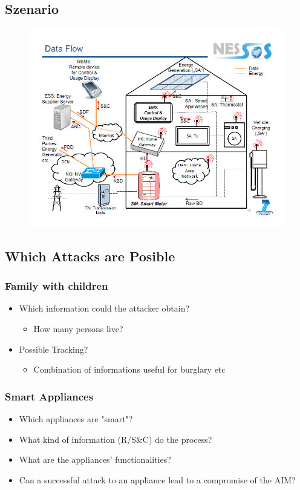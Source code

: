\documentclass[a4paper, 12pt]{article}
\begin{document}
\subsection{Szenario}
\begin{figure}[H]
\centering
\includegraphics{./img/smartgrid_datablow}
\label{fig:smartgrid_datablow}
\end{figure}

\subsection{Which Attacks are Posible}
\subsubsection{Family with children}
\begin{itemize}
\item Which information could the attacker obtain?
\begin{itemize}
\item How many persons live?
\end{itemize}
\item Possible Tracking?
\begin{itemize}
\item Combination of informations useful for burglary etc
\end{itemize}
\end{itemize}

\subsubsection{Smart Appliances}
\begin{itemize}
\item Which appliances are "smart"?
\item What kind of information (R/S\&C) do the process?
\item What are the appliances' functionalities?
\item Can a successful attack to an appliance lead to a compromise of the AIM?
\end{itemize}
\end{document}
